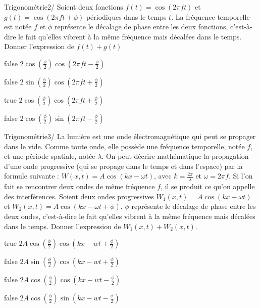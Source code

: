             \begin{question}{47}{Trigonométrie}{2}{/}
				Soient deux fonctions $f(t) = \cos(2\pi f t)$ et $g(t) = \cos(2\pi f t + \phi)$ périodiques dans le temps $t$. La fréquence temporelle est notée $f$ et  $\phi$ représente le décalage de phase entre les deux fonctions, c'est-à-dire le fait qu'elles vibrent à la même fréquence mais décalées dans le temps. Donner l'expression de $f(t) + g(t)$
            \end{question}
            \begin{reponses}
            	\item[false] $2\cos(\frac{\phi}{2})\cos(2\pi ft -\frac{\phi}{2})$
            	\item[false] $2\sin(\frac{\phi}{2})\cos(2\pi ft +\frac{\phi}{2})$
                \item[true] $2\cos(\frac{\phi}{2})\cos(2\pi ft +\frac{\phi}{2})$
                \item[false] $2\cos(\frac{\phi}{2})\sin(2\pi ft -\frac{\phi}{2})$
            \end{reponses}
        	\begin{question}{47}{Trigonométrie}{3}{/}
				La lumière est une onde électromagnétique qui peut se propager dans le vide. Comme toute onde, elle possède une fréquence temporelle, notée $f$, et une période spatiale, notée $\lambda$. On peut décrire mathématique la propagation d'une onde progressive (qui se propage dans le temps et dans l'espace) par la formule suivante : $W(x,t) = A\cos(kx - \omega t)$, avec $k=\frac{2\pi}{\lambda}$ et $\omega = 2\pi f$. Si l'on fait se rencontrer deux ondes de même fréquence $f$, il se produit ce qu'on appelle des interférences. Soient deux ondes progressives $W_1(x,t) = A\cos(kx - \omega t)$ et $W_2(x,t) = A\cos(kx - \omega t + \phi)$. $\phi$ représente le décalage de phase entre les deux ondes, c'est-à-dire le fait qu'elles vibrent à la même fréquence mais décalées dans le temps. Donner l'expression de $W_1(x,t) + W_2(x,t)$.
            \end{question}
            \begin{reponses}
            	\item[true] $2A\cos(\frac{\phi}{2})\cos(kx -wt +\frac{\phi}{2})$
            	\item[false] $2A\sin(\frac{\phi}{2})\cos(kx -wt +\frac{\phi}{2})$
                \item[false] $2A\cos(\frac{\phi}{2})\cos(kx -wt -\frac{\phi}{2})$
                \item[false] $2A\cos(\frac{\phi}{2})\sin(kx -wt -\frac{\phi}{2})$
            \end{reponses}

